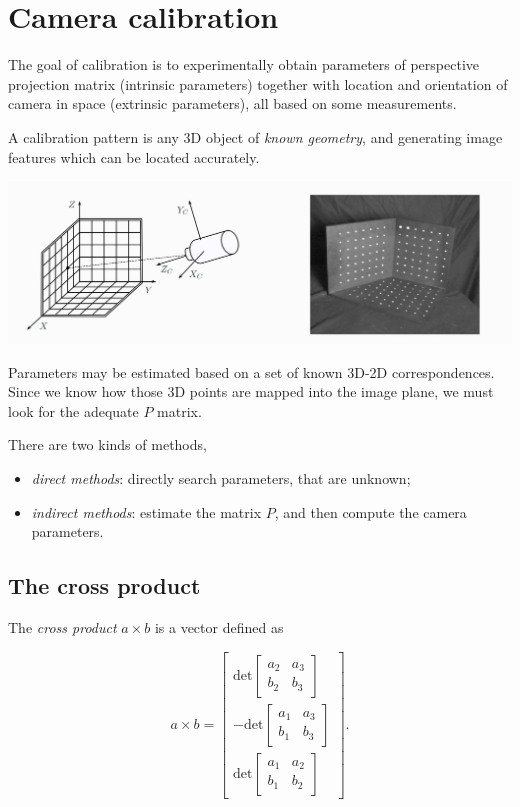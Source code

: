 \documentclass[10pt]{report}
\begin{document}
\section{Camera calibration}
\label{sec:org59b7890}
The goal of calibration is to experimentally obtain parameters of
perspective projection matrix (intrinsic parameters) together with
location and orientation of camera in space (extrinsic parameters), all
based on some measurements.

A calibration pattern is any 3D object of \emph{known geometry}, and
generating image features which can be located accurately.

\begin{center}
\includegraphics[width=.9\linewidth]{./pics/cal/calibration-pattern.jpg}
\end{center}

Parameters may be estimated based on a set of known 3D-2D
correspondences. Since we know how those 3D points are mapped into the
image plane, we must look for the adequate \(P\) matrix.

There are two kinds of methods,

\begin{itemize}
\item \emph{direct methods}: directly search parameters, that are unknown;
\item \emph{indirect methods}: estimate the matrix \(P\), and then compute the
camera parameters.
\end{itemize}

\subsection{The cross product}
\label{whats-the-cross-product}
The \emph{cross product} \(a \times b\) is a vector defined as

\[ a \times b = \begin{bmatrix} \mbox{det} \begin{bmatrix} a_2 & a_3 \\ b_2 & b_3 \end{bmatrix} \\ -\mbox{det} \begin{bmatrix} a_1 & a_3 \\ b_1 & b_3 \end{bmatrix} \\ \mbox{det} \begin{bmatrix} a_1 & a_2 \\ b_1 & b_2 \end{bmatrix} \end{bmatrix}.\]
\end{document}
